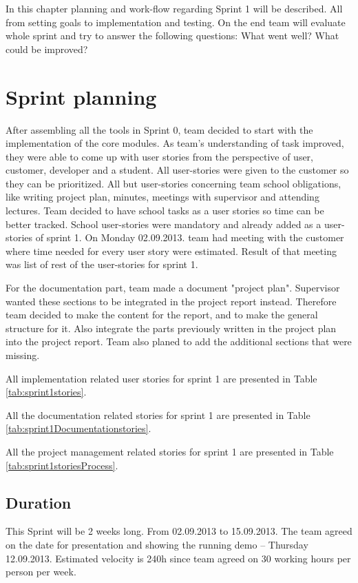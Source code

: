 In this chapter planning and work-flow regarding Sprint 1 will be described. 
All from setting  goals to implementation and testing. On the end team will evaluate whole sprint and try to answer the following questions: What went well? What could be improved? 


\section{Sprint planning}
After assembling all the tools in Sprint 0, team decided to start with the implementation of the core modules.
As team's understanding of task improved, they were able to come up with user stories from the perspective of user, customer, developer and a student.
All user-stories were given to the customer so they can be prioritized. 
All but user-stories concerning team school obligations, like writing project plan, minutes, meetings with supervisor and attending lectures.
Team decided to have school tasks as a user stories so time can be better tracked.
School user-stories were mandatory and already added as a user-stories of sprint 1.
On Monday 02.09.2013. team had meeting with the customer where time needed for every user story were estimated.
Result of that meeting was list of rest of the user-stories for sprint 1.

For the documentation part, team made a document "project plan". 
Supervisor wanted these sections to be integrated in the project report instead. 
Therefore team decided to make the content for the report, and to make the general structure for it. 
Also integrate the parts previously written in the project plan into the project report. 
Team also planed to add the additional sections that were missing.

All implementation related user stories for sprint 1 are presented in Table \ref{tab:sprint1stories}.

All the documentation related stories for sprint 1 are presented in Table \ref{tab:sprint1Documentationstories}.

All the project management related stories for sprint 1 are presented in Table \ref{tab:sprint1storiesProcess}.


\newpage
\subsection{Duration}
This Sprint will be 2 weeks long. From 02.09.2013 to 15.09.2013.
The team agreed on the date for presentation and showing the running demo -- Thursday 12.09.2013.
Estimated velocity is 240h since team agreed on 30 working hours per person per week.

